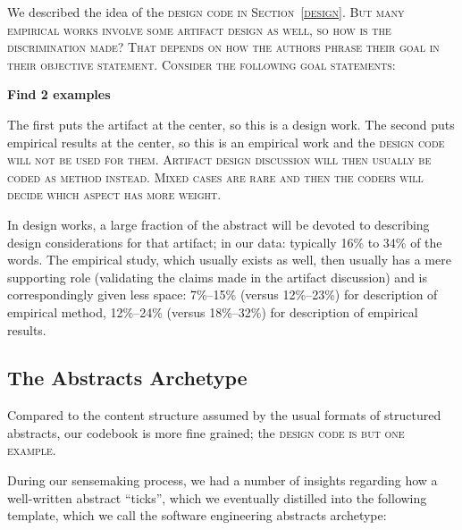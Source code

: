 \documentclass[10pt,journal,compsoc]{IEEEtran}
\newcommand{\Cb}[1]{\bgroup\scshape #1\egroup}  %
\newcommand{\Todo}[1]{\bgroup\bfseries\Large #1\egroup}
\begin{document}
We described the idea of the \Cb{design} code in Section~\ref{design}.
But many empirical works involve some artifact design as well,
so how is the discrimination made?
That depends on how the authors phrase their goal in their
\Cb{objective} statement.
Consider the following goal statements:

\Todo{Find 2 examples}

The first puts the artifact at the center, so this is a design work.
The second puts empirical results at the center, so this is an empirical work
and the \Cb{design} code will not be used for them.
Artifact design discussion will then usually be coded as \Cb{method} instead.
Mixed cases are rare and then the coders will decide which aspect has more weight.

In design works, a large fraction of the abstract will be devoted to
describing design considerations for that artifact;
in our data: typically 16\% to 34\% of the words.
The empirical study, which usually exists as well, then usually has a mere
supporting role (validating the claims made in the artifact discussion)
and is correspondingly given less space:
7\%--15\% (versus 12\%--23\%) for description of empirical method,
12\%--24\% (versus 18\%--32\%) for description of empirical results.


\subsection{The Abstracts Archetype}\label{archetype}

Compared to the content structure assumed by the usual formats of
structured abstracts, our codebook is more fine grained;
the \Cb{design} code is but one example.

During our sensemaking process, we had a number of insights regarding
how a well-written abstract ``ticks'', which we eventually distilled into
the following template, which we call the software engineering abstracts archetype:
\end{document}
